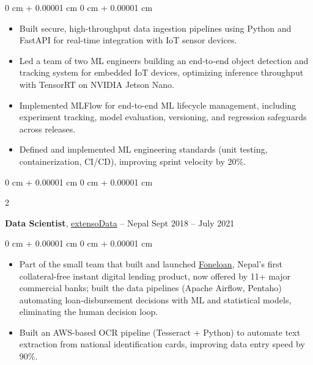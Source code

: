 \documentclass[10pt, letterpaper]{article}
\newenvironment{highlights}{
    \begin{itemize}[
        topsep=0.04 cm,
        parsep=0.04 cm,
        partopsep=0pt,
        itemsep=0pt,
        leftmargin=0 cm + 10pt
    ]
}{
    \end{itemize}
} %
\newenvironment{onecolentry}{
    \begin{adjustwidth}{
        0 cm + 0.00001 cm
    }{
        0 cm + 0.00001 cm
    }
}{
    \end{adjustwidth}
} %
\newenvironment{twocolentry}[2][]{
    \onecolentry
    \def\secondColumn{#2}
    \setcolumnwidth{\fill, 4.5 cm}
    \begin{paracol}{2}
}{
    \switchcolumn \raggedleft \secondColumn
    \end{paracol}
    \endonecolentry
} %
\begin{document}
        \vspace{0.06 cm}
        \begin{onecolentry}
            \begin{highlights}
                \item Built secure, high-throughput data ingestion pipelines using Python and FastAPI for real-time integration with IoT sensor devices.
                \item Led a team of two ML engineers building an end-to-end object detection and tracking system for embedded IoT devices, optimizing inference throughput with TensorRT on NVIDIA Jetson Nano.
                \item Implemented MLFlow for end-to-end ML lifecycle management, including experiment tracking, model evaluation, versioning, and regression safeguards across releases.
                \item Defined and implemented ML engineering standards (unit testing, containerization, CI/CD), improving sprint velocity by 20\%.
            \end{highlights}
        \end{onecolentry}

        \vspace{0.12 cm}

    \begin{twocolentry}{
            Sept 2018 – July 2021
        }
            \textbf{Data Scientist}, \href{https://www.extensodata.com/}{extensoData} -- Nepal\end{twocolentry}

        \vspace{0.06 cm}
        \begin{onecolentry}
            \begin{highlights}
                \item Part of the small team that built and launched \href{https://foneloan.com.np/}{Foneloan}, Nepal's first collateral-free instant digital lending product, now offered by 11+ major commercial banks; built the data pipelines (Apache Airflow, Pentaho) automating loan-disbursement decisions with ML and statistical models, eliminating the human decision loop.
                \item Built an AWS-based OCR pipeline (Tesseract + Python) to automate text extraction from national identification cards, improving data entry speed by 90\%.
                
            \end{highlights}
        \end{onecolentry}
\end{document}
